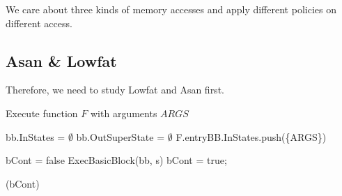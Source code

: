 We care about three kinds of memory accesses and apply different policies on different access.

\subsection{Asan \& Lowfat}
Therefore, we need to study Lowfat and Asan first.






















\begin{algorithm}
  \caption{Execute function $F$ with arguments $ARGS$}
  \footnotesize
  \begin{algorithmic}[1]
     
    \State bb.InStates = {$\emptyset$} 
    \State bb.OutSuperState = {$\emptyset$} 
    \EndFor
    \State F.entryBB.InStates.push(\{ARGS\}) 
    \State

    \Do {}

    \State bCont = false
    \State ExecBasicBlock(bb, s)
    \State bCont = true;
    \EndWhile
    \EndFor

    \doWhile(bCont)
    \EndFunction
  \end{algorithmic}
\end{algorithm}


